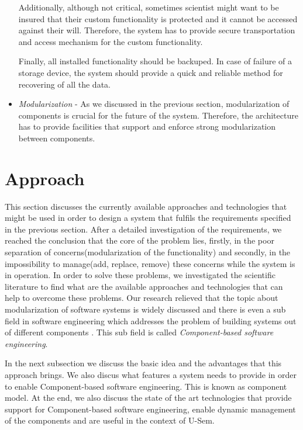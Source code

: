 \begin{itemize}
	Additionally, although not critical, sometimes scientist might want to be insured that their custom functionality is protected and it cannot be accessed against their will. Therefore, the system has to provide secure transportation and access mechanism for the custom functionality.
	
	Finally, all installed functionality should be backuped. In case of failure of a storage device, the system should provide a quick and reliable method for recovering of all the data.
	
	\item \textit{Modularization} - As we discussed in the previous section, modularization of components is crucial for the future of the system. Therefore, the architecture has to provide facilities that support and enforce strong modularization between components.
	
\end{itemize}

\section{Approach}
\label{sec:approach}

This section discusses the currently available approaches and technologies that might be used in order to design a system that fulfils the requirements specified in the previous section. After a detailed investigation of the requirements, we reached the conclusion that the core of the problem lies, firstly, in the poor separation of concerns(modularization of the functionality) and secondly, in the impossibility to manage(add, replace, remove) these concerns while the system is in operation. In order to solve these problems, we investigated the scientific literature to find what are the available approaches and technologies that can help to overcome these problems. Our research relieved that the topic about modularization of software systems is widely discussed and there is even a sub field in software engineering which addresses the problem of building systems out of different components \cite{Jifeng}. This sub field is called \textit{Component-based software engineering}. 

In the next subsection we discuss the basic idea and the advantages that this approach brings. We also discus what features a system needs to provide in order to enable Component-based software engineering. This is known as component model. At the end, we also discuss the state of the art technologies that provide support for Component-based software engineering, enable dynamic management of the components and are useful in the context of U-Sem. 

